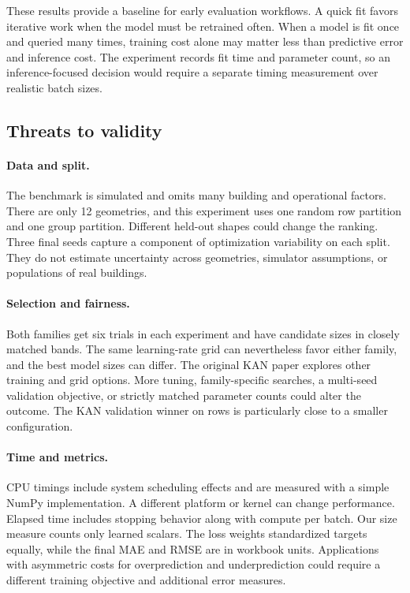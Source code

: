 \documentclass[11pt,twocolumn,letterpaper]{article}
\begin{document}
These results provide a baseline for early evaluation workflows. A quick fit favors iterative work when the model must be retrained often. When a model is fit once and queried many times, training cost alone may matter less than predictive error and inference cost. The experiment records fit time and parameter count, so an inference-focused decision would require a separate timing measurement over realistic batch sizes.

\subsection{Threats to validity}
\paragraph{Data and split.}
The benchmark is simulated and omits many building and operational factors. There are only 12 geometries, and this experiment uses one random row partition and one group partition. Different held-out shapes could change the ranking. Three final seeds capture a component of optimization variability on each split. They do not estimate uncertainty across geometries, simulator assumptions, or populations of real buildings.

\paragraph{Selection and fairness.}
Both families get six trials in each experiment and have candidate sizes in closely matched bands. The same learning-rate grid can nevertheless favor either family, and the best model sizes can differ. The original KAN paper explores other training and grid options. More tuning, family-specific searches, a multi-seed validation objective, or strictly matched parameter counts could alter the outcome. The KAN validation winner on rows is particularly close to a smaller configuration.

\paragraph{Time and metrics.}
CPU timings include system scheduling effects and are measured with a simple NumPy implementation. A different platform or kernel can change performance. Elapsed time includes stopping behavior along with compute per batch. Our size measure counts only learned scalars. The loss weights standardized targets equally, while the final MAE and RMSE are in workbook units. Applications with asymmetric costs for overprediction and underprediction could require a different training objective and additional error measures.
\end{document}
